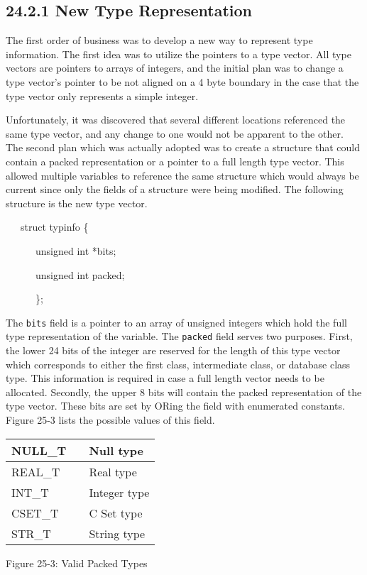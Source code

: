 \subsection[24.2.1 New Type Representation]{24.2.1 New Type Representation}

The first order of business was to develop a new way to represent type
information. The first idea was to utilize the pointers to a type
vector. All type vectors are pointers to arrays of integers, and the
initial plan was to change a type vector's pointer to be not aligned
on a 4 byte boundary in the case that the type vector only represents
a simple integer.

Unfortunately, it was discovered that several different locations
referenced the same type vector, and any change to one would not be
apparent to the other. The second plan which was actually adopted was
to create a structure that could contain a packed representation or a
pointer to a full length type vector. This allowed multiple variables
to reference the same structure which would always be current since
only the fields of a structure were being modified.  The following
structure is the new type vector.

{\ttfamily\mdseries
\ \ \ struct typinfo \{}

{\ttfamily\mdseries
\ \ \ \ \ \ unsigned int *bits;}

{\ttfamily\mdseries
\ \ \ \ \ \ unsigned int packed;}

{\ttfamily\mdseries
\ \ \ \ \ \ \};}


The \texttt{bits} field is a pointer to an array of unsigned integers
which hold the full type representation of the variable. The
\texttt{packed} field serves two purposes. First, the lower 24 bits of
the integer are reserved for the length of this type vector which
corresponds to either the first class, intermediate class, or database
class type. This information is required in case a full length vector
needs to be allocated. Secondly, the upper 8 bits will contain the
packed representation of the type vector. These bits are set by ORing
the field with enumerated constants. Figure 25-3 lists the possible
values of this field.

\begin{center}
\tabletail{}
\tablelasttail{}
\begin{xtabular}{|m{0.6629598in}|m{0.42545983in}|m{0.8122598in}|}
\hline
 NULL\_T &
 &
 Null type\\\hline
 REAL\_T &
 &
 Real type\\\hline
 INT\_T &
 &
 Integer type\\\hline
 CSET\_T &
 &
 C Set type\\\hline
 STR\_T &
 &
 String type\\\hline
\end{xtabular}
\end{center}
{\centering{}
Figure 25-3: Valid Packed Types
\par}

